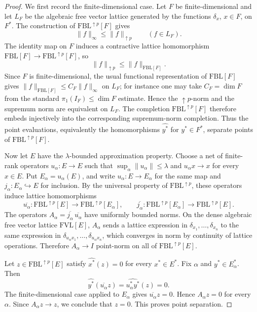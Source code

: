 \documentclass[11pt]{amsart}
\newcommand{\FBL}{\mathrm{FBL}}
\newcommand{\FVL}{\mathrm{FVL}}
\newcommand{\norm}[1]{\lVert #1\rVert}
\begin{document}
\begin{proof}
We first record the finite-dimensional case.  Let \(F\) be finite-dimensional
and let \(L_F\) be the algebraic free vector lattice generated by the functions
\(\delta_x\), \(x\in F\), on \(F^*\).  The construction of
\(\FBL^{\uparrow p}[F]\) gives
\[
  \norm{f}_\infty\leq \norm{f}_{\uparrow p}\qquad(f\in L_F).
\]
The identity map on \(F\) induces a contractive lattice homomorphism
\(\FBL[F]\to \FBL^{\uparrow p}[F]\), so
\[
  \norm{f}_{\uparrow p}\leq \norm{f}_{\FBL[F]}.
\]
Since \(F\) is finite-dimensional, the usual functional representation of
\(\FBL[F]\) gives \(\norm{f}_{\FBL[F]}\leq C_F\norm{f}_\infty\) on \(L_F\);
for instance one may take \(C_F=\dim F\) from the standard
\(\pi_1(I_F)\leq \dim F\) estimate.  Hence the \(\uparrow p\)-norm and the
supremum norm are equivalent on \(L_F\).  The completion
\(\FBL^{\uparrow p}[F]\) therefore embeds injectively into the corresponding
supremum-norm completion.  Thus the point evaluations, equivalently the
homomorphisms \(\widehat{y^*}\) for \(y^*\in F^*\), separate points of
\(\FBL^{\uparrow p}[F]\).

Now let \(E\) have the \(\lambda\)-bounded approximation property.  Choose a
net of finite-rank operators \(u_\alpha:E\to E\) such that
\(\sup_\alpha\norm{u_\alpha}\leq\lambda\) and \(u_\alpha x\to x\) for every
\(x\in E\).  Put \(E_\alpha=u_\alpha(E)\), and write \(u_\alpha:E\to E_\alpha\)
for the same map and \(j_\alpha:E_\alpha\hookrightarrow E\) for inclusion.
By the universal property of \(\FBL^{\uparrow p}\), these operators induce
lattice homomorphisms
\[
  \overline{u_\alpha}:\FBL^{\uparrow p}[E]\to
  \FBL^{\uparrow p}[E_\alpha],
  \qquad
  \overline{j_\alpha}:\FBL^{\uparrow p}[E_\alpha]\to
  \FBL^{\uparrow p}[E].
\]
The operators \(A_\alpha=\overline{j_\alpha}\,\overline{u_\alpha}\) have
uniformly bounded norms.  On the dense algebraic free vector lattice
\(\FVL[E]\), \(A_\alpha\) sends a lattice expression in
\(\delta_{x_1},\ldots,\delta_{x_n}\) to the same expression in
\(\delta_{u_\alpha x_1},\ldots,\delta_{u_\alpha x_n}\), which converges in
norm by continuity of lattice operations.  Therefore \(A_\alpha\to I\)
point-norm on all of \(\FBL^{\uparrow p}[E]\).

Let \(z\in \FBL^{\uparrow p}[E]\) satisfy
\(\widehat{x^*}(z)=0\) for every \(x^*\in E^*\).  Fix \(\alpha\) and
\(y^*\in E_\alpha^*\).  Then
\[
  \widehat{y^*}(\overline{u_\alpha}z)
  =
  \widehat{u_\alpha^*y^*}(z)
  =0.
\]
The finite-dimensional case applied to \(E_\alpha\) gives
\(\overline{u_\alpha}z=0\).  Hence \(A_\alpha z=0\) for every \(\alpha\).
Since \(A_\alpha z\to z\), we conclude that \(z=0\).  This proves point
separation.
\end{proof}
\end{document}
